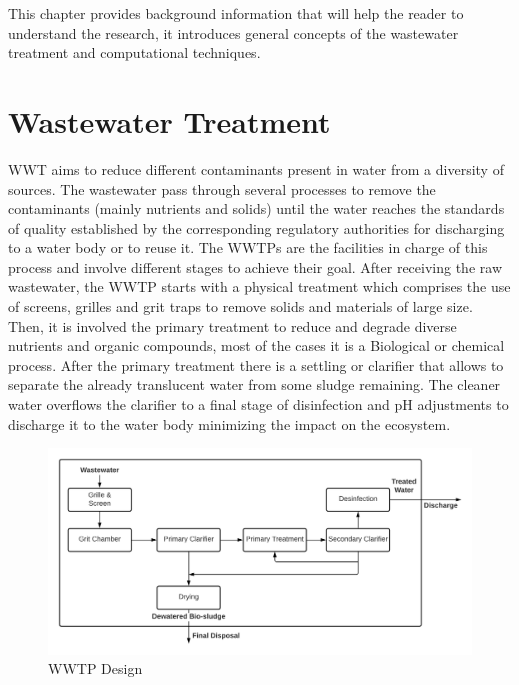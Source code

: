 This chapter provides background information that will help the reader to understand the research, it introduces general concepts of the wastewater treatment and computational techniques. 

\section{Wastewater Treatment}
\label{s:First-Background-Topic}

\ac{WWT} aims to reduce different contaminants present in water from a diversity of sources. The wastewater pass through several processes to remove the contaminants (mainly nutrients and solids) until the water reaches the standards of quality established by the corresponding regulatory authorities for discharging to a water body or to reuse it. The \ac{WWTP}s are the facilities in charge of this process and involve different stages to achieve their goal. After receiving the raw wastewater, the \ac{WWTP} starts with a physical treatment which comprises the use of screens, grilles and grit traps to remove solids and materials of large size. Then, it is involved the primary treatment to reduce and degrade diverse nutrients and organic compounds, most of the cases it is a Biological or chemical process. After the primary treatment there is a settling or clarifier that allows to separate the already translucent water from some sludge remaining. The cleaner water overflows the clarifier to a final stage of disinfection and pH adjustments to discharge it to the water body minimizing the impact on the ecosystem.

\begin{figure}[h]
\centering
\includegraphics[width=15cm]{figures/Ch2/WWTP.png}
\caption{WWTP Design}
\label{f:wwtp}
\end{figure}


